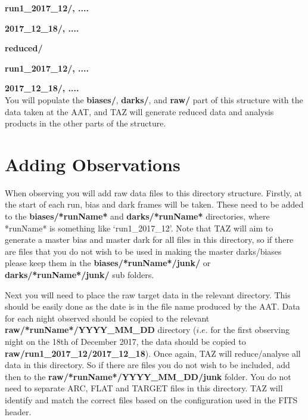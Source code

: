 \documentclass[12pt]{article}
\begin{document}
\hspace{15mm} \textbf{run1\_2017\_12/, ....} 
\vspace{1mm}

\hspace{30mm} \textbf{2017\_12\_18/, ....} 
\vspace{1mm}

\hspace{10mm} \textbf{reduced/}
\vspace{1mm}

\hspace{15mm} \textbf{run1\_2017\_12/, ....} 
\vspace{1mm}

\hspace{30mm} \textbf{2017\_12\_18/, ....} \\

You will populate the \textbf{biases/}, \textbf{darks/}, and \textbf{raw/} part of this structure with the data taken at the AAT, and TAZ will generate reduced data and analysis products in the other parts of the structure.  


\section{Adding Observations}

When observing you will add raw data files to this directory structure. Firstly, at the start of each run, bias and dark frames will be taken. These need to be added to the \textbf{biases/*runName*} and \textbf{darks/*runName*} directories, where *runName* is something like `run1\_2017\_12'. Note that TAZ will aim to generate a master bias and master dark for all files in this directory, so if there are files that you do not wish to be used in making the master darks/biases please keep them in the  \textbf{biases/*runName*/junk/} or \textbf{darks/*runName*/junk/} sub folders.

Next you will need to place the raw target data in the relevant directory. This should be easily done as the date is in the file name produced by the AAT. Data for each night observed should be copied to the relevant \textbf{raw/*runName*/YYYY\_MM\_DD} directory ($i.e.$ for the first observing night on the 18th of December 2017, the data should be copied to \textbf{raw/run1\_2017\_12/2017\_12\_18}). Once again, TAZ will reduce/analyse all data in this directory. So if there are files you do not wish to be included, add then to the \textbf{raw/*runName*/YYYY\_MM\_DD/junk} folder. You do not need to separate ARC, FLAT and TARGET files in this directory. TAZ will identify and match the correct files based on the configuration used in the FITS header.  
\end{document}
